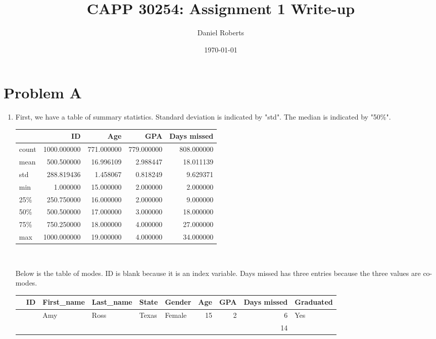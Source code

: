 \documentclass[a4paper]{article}
\title{CAPP 30254: Assignment 1 Write-up}
\author{Daniel Roberts}
\date{\today}
\begin{document}
\maketitle

\section{Problem A}
\begin{enumerate}
\item
\par
First, we have a table of summary statistics. Standard deviation is indicated by "std". The median is indicated by "50\%".
\\
\begin{tabular}{lrrrr}
\toprule
{} &           ID &         Age &         GPA &  Days missed \\
\midrule
count &  1000.000000 &  771.000000 &  779.000000 &   808.000000 \\
mean  &   500.500000 &   16.996109 &    2.988447 &    18.011139 \\
std   &   288.819436 &    1.458067 &    0.818249 &     9.629371 \\
min   &     1.000000 &   15.000000 &    2.000000 &     2.000000 \\
25\%   &   250.750000 &   16.000000 &    2.000000 &     9.000000 \\
50\%   &   500.500000 &   17.000000 &    3.000000 &    18.000000 \\
75\%   &   750.250000 &   18.000000 &    4.000000 &    27.000000 \\
max   &  1000.000000 &   19.000000 &    4.000000 &    34.000000 \\
\bottomrule
\end{tabular}
\\
\par
Below is the table of modes. ID is blank because it is an index variable. Days missed has three entries because the three values are co-modes.
\\
\par
\begin{tabular}{lrllllrrrl}
\toprule
{} &  ID & First\_name & Last\_name &  State &  Gender &  Age &  GPA &  Days missed & Graduated \\
\midrule
 &  &        Amy &      Ross &  Texas &  Female &   15 &    2 &            6 &       Yes \\
 &  &         &        &     &      &   &   &           14 &        \\

\end{tabular}
\end{enumerate}
\end{document}
